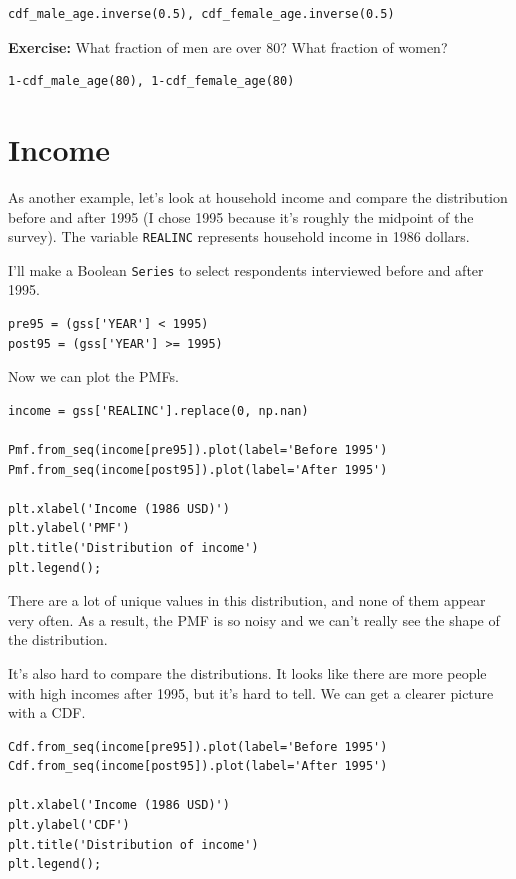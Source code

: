 \begin{lstlisting}[]
cdf_male_age.inverse(0.5), cdf_female_age.inverse(0.5)
\end{lstlisting}

\textbf{Exercise:} What fraction of men are over 80? What fraction of
women?

\begin{lstlisting}[]
1-cdf_male_age(80), 1-cdf_female_age(80)
\end{lstlisting}

\hypertarget{income}{%
\section{Income}\label{income}}

As another example, let's look at household income and compare the
distribution before and after 1995 (I chose 1995 because it's roughly
the midpoint of the survey). The variable
\passthrough{\lstinline!REALINC!} represents household income in 1986
dollars.

I'll make a Boolean \passthrough{\lstinline!Series!} to select
respondents interviewed before and after 1995.

\begin{lstlisting}[]
pre95 = (gss['YEAR'] < 1995)
post95 = (gss['YEAR'] >= 1995)
\end{lstlisting}

Now we can plot the PMFs.

\begin{lstlisting}[]
income = gss['REALINC'].replace(0, np.nan)

Pmf.from_seq(income[pre95]).plot(label='Before 1995')
Pmf.from_seq(income[post95]).plot(label='After 1995')

plt.xlabel('Income (1986 USD)')
plt.ylabel('PMF')
plt.title('Distribution of income')
plt.legend();
\end{lstlisting}

There are a lot of unique values in this distribution, and none of them
appear very often. As a result, the PMF is so noisy and we can't really
see the shape of the distribution.

It's also hard to compare the distributions. It looks like there are
more people with high incomes after 1995, but it's hard to tell. We can
get a clearer picture with a CDF.

\begin{lstlisting}[]
Cdf.from_seq(income[pre95]).plot(label='Before 1995')
Cdf.from_seq(income[post95]).plot(label='After 1995')

plt.xlabel('Income (1986 USD)')
plt.ylabel('CDF')
plt.title('Distribution of income')
plt.legend();
\end{lstlisting}

